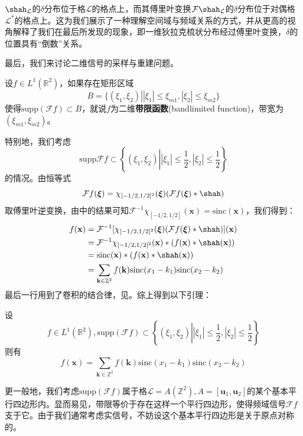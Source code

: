 $\shah_{\mathcal{L} }$的$\delta$分布位于格$\mathcal{L} $的格点上，而其傅里叶变换$\mathcal{F} \shah_{\mathcal{L} }$的$\delta$分布位于对偶格$\mathcal{L} ^*$的格点上。这为我们展示了一种理解空间域与频域关系的方式，并从更高的视角解释了我们在最后所发现的现象，即一维狄拉克梳状分布经过傅里叶变换，$\delta$的位置具有“倒数”关系。

最后，我们来讨论二维信号的采样与重建问题。
\begin{definition}[二维带限函数]
    设$f\in L^1(\mathbb{R}^2)$，如果存在矩形区域$$B=\{( \xi_1,\xi_2)\left| |\xi_1|\leq \xi_{m1},|\xi_2|\leq \xi_{m2}\right.\}$$
    使得$\mathrm{supp}(\mathcal{F}f)\subset B$，就说$f$为二维\textbf{带限函数}(bandlimited function)，带宽为$(\xi_{m1},\xi_{m2})$。
\end{definition}
特别地，我们考虑
$$\mathrm{supp}\mathcal{F} f\subset\left\{( \xi_1,\xi_2)\left| |\xi_1|\leq \dfrac{1}{2},|\xi_2|\leq \dfrac{1}{2}\right.\right\}$$
的情况。由恒等式
\[\mathcal{F} f(\boldsymbol{\xi})=\chi_{[-1/2,1/2]^2}(\boldsymbol{\xi})(\mathcal{F} f(\boldsymbol{\xi})*\shah)\]
取傅里叶逆变换，由中的结果可知$\mathcal{F} ^{-1}\chi_{[-1/2,1/2]}(\mathbf{x})=\mathrm{sinc}(\mathbf{x})$，我们得到：\begin{align*}
    f(\mathbf{x})&=\mathcal{F} ^{-1}[\chi_{[-1/2,1/2]^2}(\boldsymbol{\xi})(\mathcal{F} f(\boldsymbol{\xi})*\shah)](\mathbf{x})\\
    &=\mathcal{F} ^{-1}\chi_{[-1/2,1/2]^2}(\mathbf{x})*(f(\mathbf{x})*\shah(\mathbf{x}))\\
    &=\mathrm{sinc}(\mathbf{x})*(f(\mathbf{x})*\shah(\mathbf{x}))\\
    &=\sum_{\mathbf{k}\in\mathbb{Z}^2}f(\mathbf{k})\mathrm{sinc}(x_1-k_1)\mathrm{sinc}(x_2-k_2)
\end{align*}
最后一行用到了卷积的结合律，见。综上得到以下引理：
\begin{lemma}[方形采样公式]
    设$$f\in L^1(\mathbb{R}^2),\mathrm{supp}(\mathcal{F} f)\subset\left\{( \xi_1,\xi_2)\left| |\xi_1|\leq \dfrac{1}{2},|\xi_2|\leq \dfrac{1}{2}\right.\right\}$$
    则有
    \[f(\mathbf{x})=\sum_{\mathbf{k}\in\mathbb{Z}^2}f(\mathbf{k})\mathrm{sinc}(x_1-k_1)\mathrm{sinc}(x_2-k_2)\]
\end{lemma}

更一般地，我们考虑$\mathrm{supp}(\mathcal{F} f)$属于格$\mathcal{L} =A(\mathbb{Z}^2),A=[\mathbf{u}_1,\mathbf{u}_2]$的某个基本平行四边形内。显而易见，带限等价于存在这样一个平行四边形，使得频域信号$\mathcal{F} f$支于它。由于我们通常考虑实信号，不妨设这个基本平行四边形是关于原点对称的。

